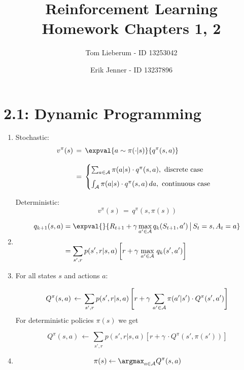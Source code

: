 \documentclass{article}
\title{Reinforcement Learning \\[3mm] Homework Chapters 1, 2}
\author{Tom Lieberum - ID 13253042 \and Erik Jenner - ID 13237896}
\begin{document}
\date{}
\maketitle


\section*{2.1: Dynamic Programming}

\begin{enumerate}[label*=\arabic*.]

\item

Stochastic:
\begin{align*}
v^\pi(s) \,&=\, \expval{a\sim\pi(\cdot|s)}{q^\pi(s,a)}\\[3mm]
\,&=\, 
\begin{cases}
\sum_{a\in\cal A}\pi(a|s) \cdot q^\pi(s,a), \,\, \text{discrete case}\\[2mm]
\int_{\cal A}\pi(a|s) \cdot q^\pi(s,a) \,da, \,\, \text{continuous case}
\end{cases}
\end{align*}


\noindent Deterministic:
\[
v^\pi(s) \,=\,  q^\pi(s,\pi(s))
\]

\item
\begin{align*}
q_{k+1}(s,a) &= \expval{}{R_{t+1} + \gamma \max_{a'\in\cal A} {q_k(S_{t+1},a')} \,\big\rvert\, S_t=s, A_t=a}\\[3mm]
&= \sum_{s',r} p(s',r|s,a)\left[ r + \gamma\, \max_{a' \in \cal A}\,q_{k}(s',a') \right]
\end{align*}


\item
For all states $s$ and actions $a$:

\[
Q^\pi(s,a) \,\leftarrow\, \sum_{s',r}p(s',r|s,a) \left[ r + \gamma\, \sum_{a'\in\cal A} \pi(a'|s')\cdot Q^\pi(s',a') \right]
\]
For deterministic policies $\pi(s)$ we get

\[
Q^\pi(s,a) \,\leftarrow\, \sum_{s',r}p(s',r|s,a) \left[ r + \gamma\, \cdot Q^\pi(s',\pi(s')) \right]
\]

\item
\[
\pi(s) \leftarrow \argmax_{a\in \cal A}Q^{\pi}(s,a)
\]

\end{enumerate}
\end{document}
